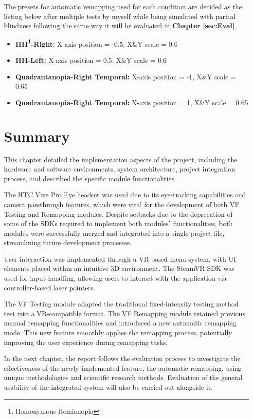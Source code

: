 \documentclass{l4proj}
\begin{document}
The presets for automatic remapping used for each condition are decided as the listing below after multiple tests by myself while being simulated with partial blindness following the same way it will be evaluated in \textbf{Chapter \ref{sec:Eval}}.

\begin{itemize}
    \item \textbf{HH\footnote{Homonymous Hemianopia}-Right:} X-axis position = -0.5, X\&Y scale = 0.6
    \item \textbf{HH-Left:} X-axis position = 0.5, X\&Y scale = 0.6
    \item \textbf{Quadrantanopia-Right Temporal:} X-axis position = -1, X\&Y scale = 0.65
    \item \textbf{Quadrantanopia-Right Temporal:} X-axis position = 1, X\&Y scale = 0.65
\end{itemize}


\section{Summary}
This chapter detailed the implementation aspects of the project, including the hardware and software environments, system architecture, project integration process, and described the specific module functionalities.

The HTC Vive Pro Eye headset was used due to its eye-tracking capabilities and camera passthrough features, which were vital for the development of both VF Testing and Remapping modules. Despite setbacks due to the deprecation of some of the SDKs required to implement both modules' functionalities, both modules were successfully merged and integrated into a single project file, streamlining future development processes. 

User interaction was implemented through a VR-based menu system, with UI elements placed within an intuitive 3D environment. The SteamVR SDK was used for input handling, allowing users to interact with the application via controller-based laser pointers.

The VF Testing module adapted the traditional fixed-intensity testing method test into a VR-compatible format. The VF Remapping module retained previous manual remapping functionalities and introduced a new automatic remapping mode. This new feature smoothly applies the remapping process, potentially improving the user experience during remapping tasks.

In the next chapter, the report follows the evaluation process to investigate the effectiveness of the newly implemented feature, the automatic remapping, using unique methodologies and scientific research methods. Evaluation of the general usability of the integrated system will also be carried out alongside it.
\end{document}
